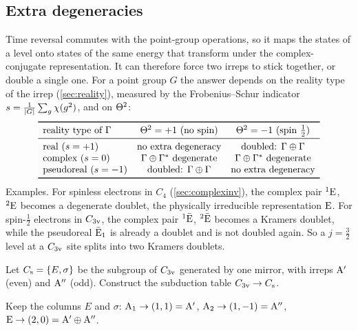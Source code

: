 \subsection{Extra degeneracies}\label{sec:herring}
Time reversal commutes with the point-group operations, so it maps the states of a
level onto states of the same energy that transform under the complex-conjugate
representation. It can therefore force two irreps to stick together, or double a
single one. For a point group $G$ the answer depends on the reality type of the irrep
(\cref{sec:reality}), measured by the Frobenius--Schur indicator
$s=\frac{1}{\lvert G\rvert}\sum_g\chi(g^2)$, and on $\Theta^2$:
\begin{equation}
\begin{array}{lcc}
\toprule
\text{reality type of }\Gamma & \TR^2=+1\ \text{(no spin)} & \TR^2=-1\ \text{(spin }\tfrac12)\\
\midrule
\text{real } (s=+1) & \text{no extra degeneracy} & \text{doubled: } \Gamma\oplus\Gamma\\
\text{complex } (s=0) & \Gamma\oplus\Gamma^{*}\ \text{degenerate} & \Gamma\oplus\Gamma^{*}\ \text{degenerate}\\
\text{pseudoreal } (s=-1) & \text{doubled: } \Gamma\oplus\Gamma & \text{no extra degeneracy}\\
\bottomrule
\end{array}
\end{equation}
Examples. For spinless electrons in $C_4$ (\cref{sec:complexinv}), the complex pair
${}^{1}\mathrm{E}$, ${}^{2}\mathrm{E}$ becomes a degenerate doublet, the physically
irreducible representation $\mathrm{E}$. For spin-$\tfrac12$ electrons in $C_{3\mathrm{v}}$, the
complex pair ${}^{1}\bar{\mathrm{E}}$, ${}^{2}\bar{\mathrm{E}}$ becomes a Kramers doublet, while
the pseudoreal $\bar{\mathrm{E}}_1$ is already a doublet and is not doubled again. So a
$j=\tfrac32$ level at a $C_{3\mathrm{v}}$ site splits into two Kramers doublets.

\exercisesection

\begin{exercise}\label{ex:5:Cs}
Let $C_{\mathrm{s}}=\{E,\sigma\}$ be the subgroup of $C_{3\mathrm{v}}$ generated by one mirror, with irreps
$\mathrm{A}'$ (even) and $\mathrm{A}''$ (odd). Construct the subduction table
$C_{3\mathrm{v}}\to C_{\mathrm{s}}$.
\end{exercise}

\begin{solution}
Keep the columns $E$ and $\sigma$: $\mathrm{A}_1\to(1,1)=\mathrm{A}'$,
$\mathrm{A}_2\to(1,-1)=\mathrm{A}''$, $\mathrm{E}\to(2,0)=\mathrm{A}'\oplus\mathrm{A}''$.
\end{solution}

